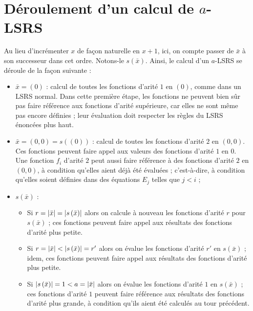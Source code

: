 \documentclass{report}
\begin{document}
	
	\section{Déroulement d'un calcul de $a$-LSRS}
	\label{par:deroulement_aLSRS}
	Au lieu d'incrémenter $x$ de façon naturelle en $x+1$, ici, on compte passer de $\bar{x}$ à son successeur dans cet ordre. Notons-le $s\left(\bar{x}\right)$. Ainsi, le calcul d'un $a$-LSRS se déroule de la façon suivante :
	
	\begin{itemize}[itemsep=-1mm]
		\item 	$\bar{x} = (0)$ : calcul de toutes les fonctions d'arité $1$ en $(0)$, comme dans un LSRS normal. Dans cette première étape, les fonctions ne peuvent bien sûr pas faire référence aux fonctions d'arité supérieure, car elles ne sont même pas encore définies ; leur évaluation doit respecter les règles du LSRS énoncées plus haut. 
		\item 	$\bar{x} = (0,0) = s\left( \left( 0 \right)\right)$ : calcul de toutes les fonctions d'arité $2$ en $(0,0)$. Ces fonctions peuvent faire appel aux valeurs des fonctions d'arité $1$ en $0$. Une fonction $f_i$ d'arité $2$ peut aussi faire référence à des fonctions d'arité $2$ en $(0,0)$, à condition qu'elles aient déjà été évaluées ; c'est-à-dire, à condition qu'elles soient définies dans des équations $E_j$ telles que $j<i$ ;
		\item  	$s\left(\bar{x}\right)$ :
			\begin{itemize}[itemsep=-1mm]
				\item 	Si $r = \left|\bar{x}\right| = \left|s\left(\bar{x}\right)\right|$ alors on calcule à nouveau les fonctions d'arité $r$ pour $s\left(\bar{x}\right)$ ; ces fonctions peuvent faire appel aux résultats des fonctions d'arité plus petite. 
				\item 	Si $r = \left|\bar{x}\right| < \left|s\left(\bar{x}\right)\right| = r'$ alors on évalue les fonctions d'arité $r'$ en $s\left(\bar{x}\right)$ ; idem, ces fonctions peuvent faire appel aux résultats des fonctions d'arité plus petite.
				\item 	Si $\left|s\left(\bar{x}\right)\right| = 1 < a = \left|\bar{x}\right|$ alors on évalue les fonctions d'arité $1$ en $s\left(\bar{x}\right)$ ; ces fonctions d'arité $1$ peuvent faire référence aux résultats des fonctions d'arité plus grande, à condition qu'ils aient été calculés au tour précédent. 
			\end{itemize}
	\end{itemize}
	
\end{document}
